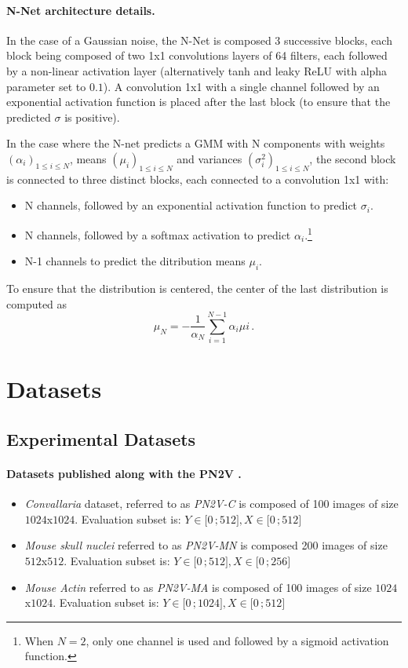 \documentclass{article}
\newcommand{\interval}[2]{\mathopen{[}#1\,;#2\mathclose{]}}
\begin{document}
\paragraph{N-Net architecture details.}
In the case of a Gaussian noise, the N-Net is composed 3 successive blocks, each block being composed of two 1x1 convolutions layers of 64 filters, each followed by a non-linear activation layer (alternatively tanh and leaky ReLU with alpha parameter set to $0.1$). A convolution 1x1 with a single channel followed by an exponential activation function is placed after the last block (to ensure that the predicted $\sigma$ is positive).

In the case where the N-net predicts a GMM with N components with weights $(\alpha_i)_{1\leqslant i\leqslant N}$, means $(\mu_i)_{1\leqslant i\leqslant N}$ and variances $(\sigma^2_i)_{1\leqslant i\leqslant N}$, the second block is connected to three distinct blocks, each connected to a convolution 1x1 with:
\begin{itemize}
  \item N channels, followed by an exponential activation function to predict $\sigma_{i}$.
  \item N channels, followed by a softmax activation to predict $\alpha_{i}.$\footnote{When $N=2$, only one channel is used and followed by a sigmoid activation function.}
  \item N-1 channels to predict the ditribution means $\mu_{i}$.
\end{itemize}
To ensure that the distribution is centered, the center of the last distribution is computed as
$$
\mu_{N} = - \frac{1}{\alpha_{N}} \sum_{i=1}^{N-1}{\alpha_{i} \mu{i}}\,.
$$

\section{Datasets}
\subsection{Experimental Datasets}
\label{si:datasetxp}
\paragraph{Datasets published along with the PN2V \cite{krull2019probabilistic}.}
\begin{itemize}
  \item \emph{Convallaria} dataset, referred to as \emph{PN2V-C} is composed of 100 images of size $1024$x$1024$. Evaluation subset is: $Y\in\interval{0}{512}, X\in\interval{0}{512}$
  \item \emph{Mouse skull nuclei} referred to as \emph{PN2V-MN} is composed 200 images of size $512$x$512$. Evaluation subset is: $Y\in\interval{0}{512}, X\in\interval{0}{256}$
  \item \emph{Mouse Actin} referred to as \emph{PN2V-MA} is composed of 100 images of size $1024$x$1024$. Evaluation subset is: $Y\in\interval{0}{1024}, X\in\interval{0}{512}$
\end{itemize}
\end{document}
